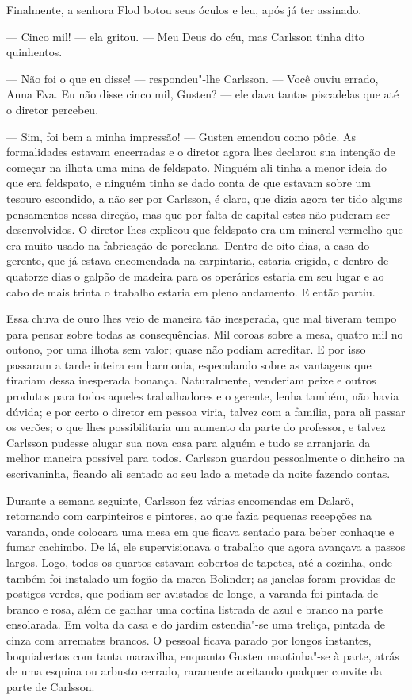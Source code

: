 Finalmente, a senhora Flod botou seus óculos e leu, após já ter assinado.

--- Cinco mil! --- ela gritou. --- Meu Deus do céu, mas Carlsson tinha dito
quinhentos.

--- Não foi o que eu disse! --- respondeu"-lhe Carlsson. --- Você ouviu errado, Anna
Eva. Eu não disse cinco mil, Gusten? --- ele dava tantas piscadelas que até o
diretor percebeu.

--- Sim, foi bem a minha impressão! --- Gusten emendou como pôde. As
formalidades estavam encerradas e o diretor agora lhes declarou sua intenção de
começar na ilhota uma mina de feldspato. Ninguém ali tinha a menor ideia do que
era feldspato, e ninguém tinha se dado conta de que estavam sobre um tesouro
escondido, a não ser por Carlsson, é claro, que dizia agora ter tido alguns
pensamentos nessa direção, mas que por falta de capital estes não puderam ser
desenvolvidos. O diretor lhes explicou que feldspato era um mineral vermelho que
era muito usado na fabricação de porcelana. Dentro de oito dias, a casa do
gerente, que já estava encomendada na carpintaria, estaria erigida, e dentro de
quatorze dias o galpão de madeira para os operários estaria em seu lugar e
ao cabo de mais trinta o trabalho estaria em pleno andamento. E então partiu.

Essa chuva de ouro lhes veio de maneira tão inesperada, que mal tiveram
tempo para pensar sobre todas as consequências. Mil coroas sobre a mesa,
quatro mil no outono, por uma ilhota sem valor; quase não podiam acreditar. E
por isso passaram a tarde inteira em harmonia, especulando sobre as vantagens
que tirariam dessa inesperada bonança. Naturalmente, venderiam peixe e outros
produtos para todos aqueles trabalhadores e o gerente, lenha também, não havia
dúvida; e por certo o diretor em pessoa viria, talvez com a família, para
ali passar os verões; o que lhes possibilitaria um aumento da parte do
professor, e talvez Carlsson pudesse alugar sua nova casa para alguém e tudo
se arranjaria da melhor maneira possível para todos. Carlsson guardou pessoalmente o dinheiro na
escrivaninha, ficando ali sentado ao seu lado a metade da noite fazendo contas.

\asterisc

Durante a semana seguinte, Carlsson fez várias encomendas em Dalarö,
retornando com carpinteiros e pintores, ao que fazia pequenas recepções na
varanda, onde colocara uma mesa em que ficava sentado para beber conhaque e
fumar cachimbo. De lá, ele supervisionava o trabalho que agora avançava a
passos largos. Logo, todos os quartos estavam cobertos de tapetes, até a
cozinha, onde também foi instalado um fogão da marca Bolinder; as janelas foram
providas de postigos verdes, que podiam ser avistados de longe, a varanda foi
pintada de branco e rosa, além de ganhar uma cortina listrada de azul e branco
na parte ensolarada. Em volta da casa e do jardim estendia"-se uma treliça,
pintada de cinza com arremates brancos. O pessoal ficava parado por longos instantes, 
boquiabertos com tanta maravilha, enquanto Gusten mantinha"-se à parte,
atrás de uma esquina ou arbusto cerrado, raramente aceitando qualquer convite da
parte de Carlsson.

